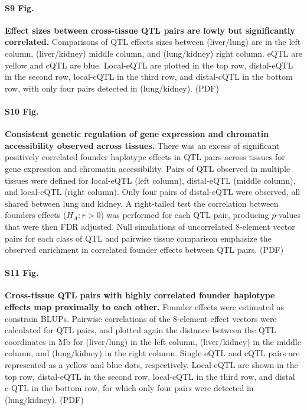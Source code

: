 \documentclass[10pt,letterpaper]{article}
\begin{document}
\paragraph*{S9 Fig.}
\label{S_qtl_effect_size_comparison}
{\bf Effect sizes between cross-tissue QTL pairs are lowly but significantly correlated.}
Comparisons of QTL effects sizes between (liver/lung) are in the left column, (liver/kidney) middle column, and (lung/kidney) right column. eQTL are yellow and cQTL are blue. Local-eQTL are plotted in the top row, distal-eQTL in the second row, local-cQTL in the third row, and distal-cQTL in the bottom row, with only four pairs detected in (lung/kidney). (PDF)

\paragraph*{S10 Fig.}
\label{S_qtl_pair_histograms}
{\bf Consistent genetic regulation of gene expression and chromatin accessibility observed across tissues.}
There was an excess of significant positively correlated founder haplotype effects in QTL pairs across tissues for gene expression and chromatin accessibility. Pairs of QTL observed in multiple tissues were defined for local-eQTL (left column), distal-eQTL (middle column), and local-cQTL (right column). Only four pairs of distal-cQTL were observed, all shared between lung and kidney. A right-tailed test the correlation between founders effects ($H_{A}: r > 0$) was performed for each QTL pair, producing $p$-values that were then FDR adjusted. Null simulations of uncorrelated 8-element vector pairs for each class of QTL and pairwise tissue comparison emphasize the observed enrichment in correlated founder effects between QTL pairs. (PDF)

\paragraph*{S11 Fig.}
\label{S_qtl_cor_by_distance_comparison}
{\bf Cross-tissue QTL pairs with highly correlated founder haplotype effects map proximally to each other.}
Founder effects were estimated as constrain BLUPs. Pairwise correlations of the 8-element effect vectors were calculated for QTL pairs, and plotted again the distance between the QTL coordinates in Mb for (liver/lung) in the left column, (liver/kidney) in the middle column, and (lung/kidney) in the right column. Single eQTL and cQTL pairs are represented as a yellow and blue dots, respectively. Local-eQTL are shown in the top row, distal-eQTL in the second row, local-cQTL in the third row, and distal c-QTL in the bottom row, for which only four pairs were detected in (lung/kidney). (PDF)
\end{document}
